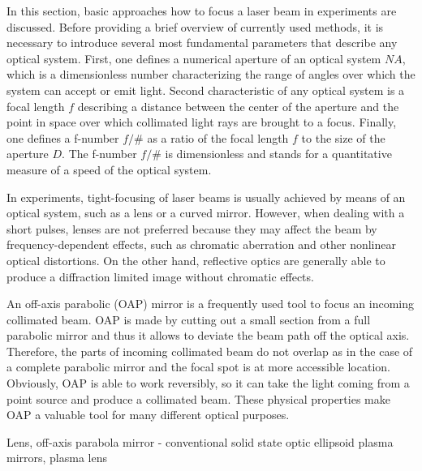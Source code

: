 In this section, basic approaches how to focus a laser beam in experiments are discussed. Before providing a brief overview of currently used methods, it is necessary to introduce several most fundamental parameters that describe any optical system. First, one defines a numerical aperture of an optical system $ N\!A $, which is a dimensionless number characterizing the range of angles over which the system can accept or emit light. Second characteristic of any optical system is a focal length $ f $ describing a distance between the center of the aperture and the point in space over which collimated light rays are brought to a focus. Finally, one defines a f-number $ f/\# $ as a ratio of the focal length $ f $ to the size of the aperture $ D $. The f-number $ f/\# $ is dimensionless and stands for a quantitative measure of a speed of the optical system.

In experiments, tight-focusing of laser beams is usually achieved by means of an optical system, such as a lens or a curved mirror. However, when dealing with a short pulses, lenses are not preferred because they may affect the beam by frequency-dependent effects, such as chromatic aberration and other nonlinear optical distortions. On the other hand, reflective optics are generally able to produce a diffraction limited image without chromatic effects.

An off-axis parabolic (OAP) mirror is a frequently used tool to focus an incoming collimated beam. OAP is made by cutting out a small section from a full parabolic mirror and thus it allows to deviate the beam path off the optical axis. Therefore, the parts of incoming collimated beam do not overlap as in the case of a complete parabolic mirror and the focal spot is at more accessible location. Obviously, OAP is able to work reversibly, so it can take the light coming from a point source and produce a collimated beam. These physical properties make OAP a valuable tool for many different optical purposes.

Lens, off-axis parabola mirror - conventional solid state optic
ellipsoid plasma mirrors, plasma lens



